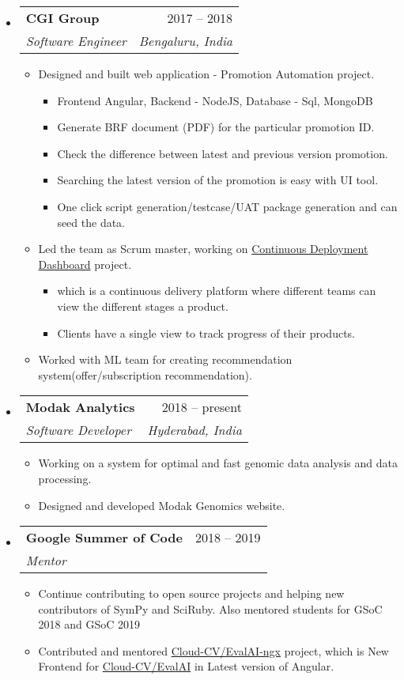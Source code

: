 \documentclass[letterpaper,12pt]{article}[leftmargin=*]
\makeatletter
\def \entryspacing {-0pt}
\newcommand{\resumeEntryStart}{\begin{itemize}[leftmargin=2.5mm]}
\newcommand{\resumeEntryEnd}{\end{itemize}\vspace{\entryspacing}}
\newcommand{\resumeItemListStart}{\begin{itemize}[leftmargin=4.5mm]}
\newcommand{\resumeItemListEnd}{\end{itemize}}
\newcommand{\resumeItem}[1]{
  \item\small{
    {#1 \vspace{-2pt}}
  }
}
\newcommand{\resumeEntryTSDL}[4]{
  \vspace{-1pt}\item[]
    \begin{tabular*}{0.97\textwidth}{l@{\extracolsep{\fill}}r}
      \textbf{\color{primary}#1} & {\firabook\color{accent}\small#2} \\
      \textit{\color{accent}\small#3} & \textit{\color{accent}\small#4} \\
    \end{tabular*}\vspace{-6pt}
}
\makeatother
\begin{document}
  \resumeEntryStart
    \resumeEntryTSDL
      {CGI Group}{ 2017 -- 2018}
      {Software Engineer}{Bengaluru, India}
    \resumeItemListStart
      \resumeItem {Designed and built web application - Promotion Automation project.}
      \begin{itemize}
         \item Frontend Angular, Backend - NodeJS, Database - Sql, MongoDB
         \item Generate BRF document (PDF) for the particular promotion ID.
         \item Check the difference between latest and previous version promotion.
         \item Searching the latest version of the promotion is easy with UI tool.
         \item One click script generation/testcase/UAT package generation and can seed the data.
       \end{itemize}
      \resumeItem {Led the team as Scrum master, working on \href{http://slides.com/shekharrajak/dd/}{Continuous Deployment Dashboard} project. }
      \begin{itemize}
          \item which is a continuous delivery platform where different teams can view the different stages a product.
          \item Clients have a single view to track progress of their products.
      \end{itemize}
      \resumeItem {Worked with ML team for creating recommendation system(offer/subscription recommendation).}
    \resumeItemListEnd
  \resumeEntryEnd

  \resumeEntryStart
    \resumeEntryTSDL
      {Modak Analytics}{2018 -- present}
      {Software Developer}{Hyderabad, India}
    \resumeItemListStart
      \resumeItem {Working on a system for optimal and fast genomic data analysis and
data processing.}
      \resumeItem {Designed and developed Modak Genomics website.}
    \resumeItemListEnd
  \resumeEntryEnd


  \resumeEntryStart
    \resumeEntryTSDL
      {Google Summer of Code}{2018 -- 2019}
      {Mentor}{}
    \resumeItemListStart
      \resumeItem {Continue contributing to open source projects and helping new contributors of SymPy and SciRuby. Also mentored students for GSoC 2018 and GSoC 2019}
      \resumeItem {Contributed and mentored \href{https://github.com/Cloud-CV/EvalAI-ngx}{Cloud-CV/EvalAI-ngx} project, which is New Frontend for \href{https://github.com/Cloud-CV/EvalAI}{Cloud-CV/EvalAI} in Latest version of Angular.}
    \resumeItemListEnd
  \resumeEntryEnd
\end{document}
